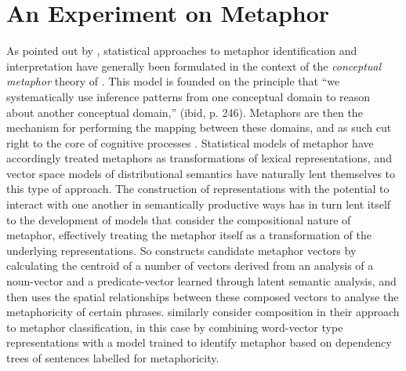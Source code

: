 \section{An Experiment on Metaphor} \label{sec:metperiment}
As pointed out by \cite{ShutovaEA2013}, statistical approaches to metaphor identification and interpretation have generally been formulated in the context of the \emph{conceptual metaphor} theory of \cite{LakoffEA2003}.  This model is founded on the principle that ``we systematically use inference patterns from one conceptual domain to reason about another conceptual domain,'' (ibid, p. 246).  Metaphors are then the mechanism for performing the mapping between these domains, and as such cut right to the core of cognitive processes \citep{Gibbs1994}.  Statistical models of metaphor have accordingly treated metaphors as transformations of lexical representations, and vector space models of distributional semantics have naturally lent themselves to this type of approach.  The construction of representations with the potential to interact with one another in semantically productive ways has in turn lent itself to the development of models that consider the compositional nature of metaphor, effectively treating the metaphor itself as a transformation of the underlying representations.  So \cite{Utsumi2011} constructs candidate metaphor vectors by calculating the centroid of a number of vectors derived from an analysis of a noun-vector and a predicate-vector learned through latent semantic analysis, and then uses the spatial relationships between these composed vectors to analyse the metaphoricity of certain phrases.  \cite{HovyEA2013} similarly consider composition in their approach to metaphor classification, in this case by combining word-vector type representations with a model trained to identify metaphor based on dependency trees of sentences labelled for metaphoricity.

